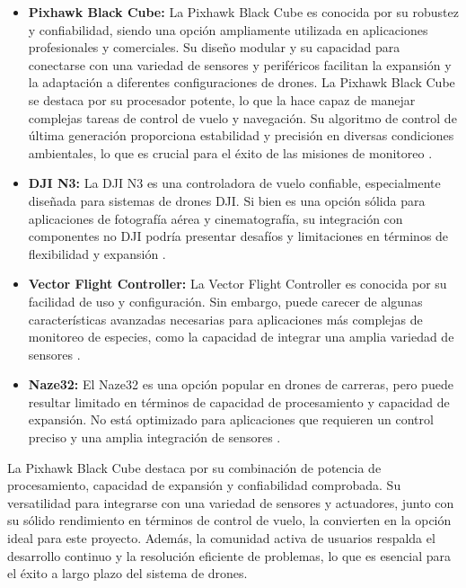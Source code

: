 \begin{itemize}
\item \textbf{Pixhawk Black Cube:} La Pixhawk Black Cube es conocida por su robustez y confiabilidad, siendo una opción ampliamente utilizada en aplicaciones profesionales y comerciales. Su diseño modular y su capacidad para conectarse con una variedad de sensores y periféricos facilitan la expansión y la adaptación a diferentes configuraciones de drones. La Pixhawk Black Cube se destaca por su procesador potente, lo que la hace capaz de manejar complejas tareas de control de vuelo y navegación. Su algoritmo de control de última generación proporciona estabilidad y precisión en diversas condiciones ambientales, lo que es crucial para el éxito de las misiones de monitoreo \cite{pix}.
\item \textbf{DJI N3:} La DJI N3 es una controladora de vuelo confiable, especialmente diseñada para sistemas de drones DJI. Si bien es una opción sólida para aplicaciones de fotografía aérea y cinematografía, su integración con componentes no DJI podría presentar desafíos y limitaciones en términos de flexibilidad y expansión \cite{dji}.
\item \textbf{Vector Flight Controller:} La Vector Flight Controller es conocida por su facilidad de uso y configuración. Sin embargo, puede carecer de algunas características avanzadas necesarias para aplicaciones más complejas de monitoreo de especies, como la capacidad de integrar una amplia variedad de sensores \cite{vector}.
\item \textbf{Naze32:} El Naze32 es una opción popular en drones de carreras, pero puede resultar limitado en términos de capacidad de procesamiento y capacidad de expansión. No está optimizado para aplicaciones que requieren un control preciso y una amplia integración de sensores \cite{naze}.
\end{itemize}
La Pixhawk Black Cube destaca por su combinación de potencia de procesamiento, capacidad de expansión y confiabilidad comprobada. Su versatilidad para integrarse con una variedad de sensores y actuadores, junto con su sólido rendimiento en términos de control de vuelo, la convierten en la opción ideal para este proyecto. Además, la comunidad activa de usuarios respalda el desarrollo continuo y la resolución eficiente de problemas, lo que es esencial para el éxito a largo plazo del sistema de drones.


